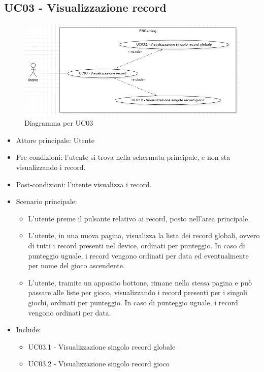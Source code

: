 \subsection{UC03 - Visualizzazione record}
\begin{figure}[h]
    \centering
    \includegraphics[width=400pt]{images/usecase/UC03.png}
    \caption{Diagramma per UC03}
    \label{fig:UC03}
\end{figure}
\begin{itemize}
    \item Attore principale: Utente
    \item Pre-condizioni: l'utente si trova nella schermata principale, e non sta visualizzando i record.
    \item Post-condizioni: l'utente visualizza i record.
    \item Scenario principale: \begin{itemize}
        \item L'utente preme il pulsante relativo ai record, posto nell'area principale.
        \item L'utente, in una nuova pagina, visualizza la lista dei record globali, ovvero di tutti i record presenti nel device, ordinati per punteggio. In caso di punteggio uguale, i record vengono ordinati per data ed eventualmente per nome del gioco ascendente.
        \item L'utente, tramite un apposito bottone, rimane nella stessa pagina e può passare alle liste per gioco, visualizzando i record presenti per i singoli giochi, ordinati per punteggio. In caso di punteggio uguale, i record vengono ordinati per data.
    \end{itemize}
    \item Include: \begin{itemize}
        \item UC03.1 - Visualizzazione singolo record globale
        \item UC03.2 - Visualizzazione singolo record gioco
    \end{itemize}
\end{itemize}


